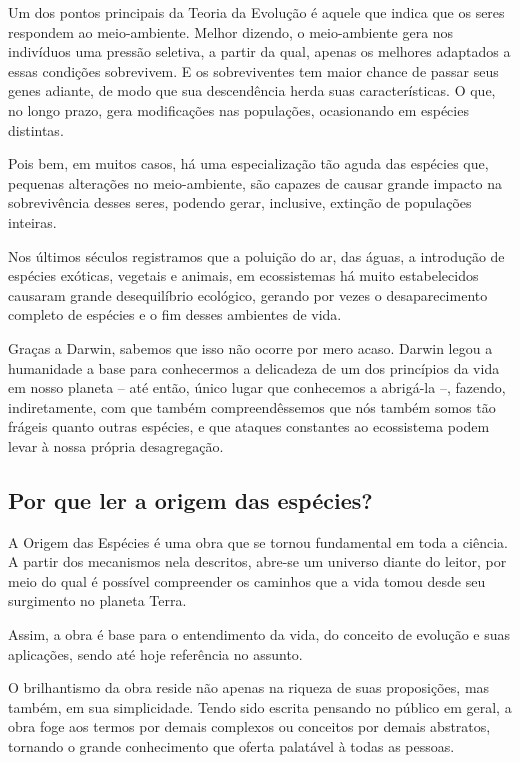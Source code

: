\documentclass[11pt]{extarticle}
\begin{document}
Um dos pontos principais da Teoria da Evolução é aquele que indica que os seres
respondem ao meio-ambiente. Melhor dizendo, o meio-ambiente gera nos indivíduos
uma pressão seletiva, a partir da qual, apenas os melhores adaptados a essas
condições sobrevivem. E os sobreviventes tem maior chance de passar seus genes
adiante, de modo que sua descendência herda suas características. O que, no
longo prazo, gera modificações nas populações, ocasionando em espécies
distintas.

Pois bem, em muitos casos, há uma especialização tão aguda das espécies que,
pequenas alterações no meio-ambiente, são capazes de causar grande impacto na
sobrevivência desses seres, podendo gerar, inclusive, extinção de populações
inteiras.

Nos últimos séculos registramos que a poluição do ar, das águas, a introdução
de espécies exóticas, vegetais e animais, em ecossistemas há muito
estabelecidos causaram grande desequilíbrio ecológico, gerando por vezes
o desaparecimento completo de espécies e o fim desses ambientes de vida.

Graças a Darwin, sabemos que isso não ocorre por mero acaso. Darwin legou
a humanidade a base para conhecermos a delicadeza de um dos princípios da vida
em nosso planeta -- até então, único lugar que conhecemos a abrigá-la --,
fazendo, indiretamente, com que também compreendêssemos que nós também somos
tão frágeis quanto outras espécies, e que ataques constantes ao ecossistema
podem levar à nossa própria desagregação.

\subsection{Por que ler a origem das espécies?}

A Origem das Espécies é uma obra que se tornou fundamental em toda
a ciência. A partir dos mecanismos nela descritos, abre-se um universo diante
do leitor, por meio do qual é possível compreender os caminhos que a vida tomou
desde seu surgimento no planeta Terra.

Assim, a obra é base para o entendimento da vida, do conceito de evolução e suas
aplicações, sendo até hoje referência no assunto.

O brilhantismo da obra reside não apenas na riqueza de suas proposições, mas
também, em sua simplicidade. Tendo sido escrita pensando no público em geral,
a obra foge aos termos por demais complexos ou conceitos por demais abstratos,
tornando o grande conhecimento que oferta palatável à todas as pessoas.
\end{document}
